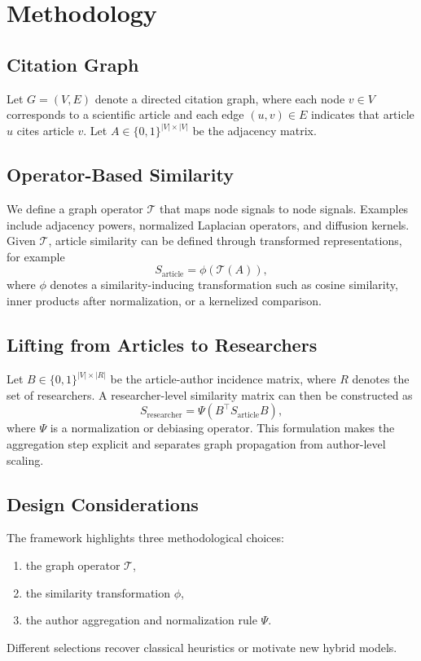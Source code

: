 \section{Methodology}
\label{sec:methodology}

\subsection{Citation Graph}

Let $G = (V, E)$ denote a directed citation graph, where each node $v \in V$ corresponds
to a scientific article and each edge $(u, v) \in E$ indicates that article $u$ cites
article $v$. Let $A \in \{0,1\}^{|V| \times |V|}$ be the adjacency matrix.

\subsection{Operator-Based Similarity}

We define a graph operator $\mathcal{T}$ that maps node signals to node signals. Examples
include adjacency powers, normalized Laplacian operators, and diffusion kernels. Given
$\mathcal{T}$, article similarity can be defined through transformed representations,
for example
\[
S_{\text{article}} = \phi(\mathcal{T}(A)),
\]
where $\phi$ denotes a similarity-inducing transformation such as cosine similarity, inner
products after normalization, or a kernelized comparison.

\subsection{Lifting from Articles to Researchers}

Let $B \in \{0,1\}^{|V| \times |R|}$ be the article-author incidence matrix, where
$R$ denotes the set of researchers. A researcher-level similarity matrix can then be
constructed as
\[
S_{\text{researcher}} = \Psi(B^\top S_{\text{article}} B),
\]
where $\Psi$ is a normalization or debiasing operator. This formulation makes the
aggregation step explicit and separates graph propagation from author-level scaling.

\subsection{Design Considerations}

The framework highlights three methodological choices:
\begin{enumerate}
    \item the graph operator $\mathcal{T}$,
    \item the similarity transformation $\phi$,
    \item the author aggregation and normalization rule $\Psi$.
\end{enumerate}

Different selections recover classical heuristics or motivate new hybrid models.
